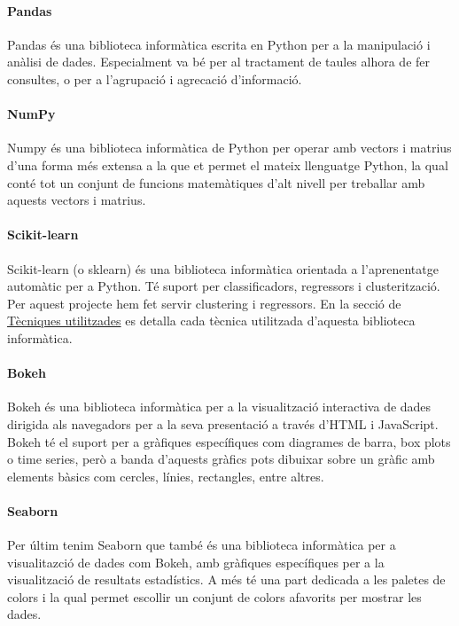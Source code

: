 \documentclass[12pt,a4paper,catalan]{article}
\begin{document}
\hypertarget{pandas}{
	\paragraph{Pandas}
}
Pandas \cite{pandas} és una biblioteca informàtica escrita en Python per a la manipulació i anàlisi de dades. Especialment va bé per al tractament de taules alhora de fer consultes, o per a l'agrupació i agrecació d'informació.

\hypertarget{numpy}{
	\paragraph{NumPy}
}
Numpy \cite{numpy} és una biblioteca informàtica de Python per operar amb vectors i matrius d'una forma més extensa a la que et permet el mateix llenguatge Python, la qual conté tot un conjunt de funcions matemàtiques d'alt nivell per treballar amb aquests vectors i matrius.

\hypertarget{sklearn}{
	\paragraph{Scikit-learn}
}
Scikit-learn \cite{sklearn} (o sklearn) és una biblioteca informàtica orientada a l'aprenentatge automàtic per a Python. Té suport per classificadors, regressors i clusterització. Per aquest projecte hem fet servir clustering i regressors. En la secció de \hyperlink{tecniquesutilitzades}{Tècniques utilitzades} es detalla cada tècnica utilitzada d'aquesta biblioteca informàtica.

\paragraph{Bokeh}
Bokeh \cite{bokeh} és una biblioteca informàtica per a la visualització interactiva de dades dirigida als navegadors per a la seva presentació a través d'HTML i JavaScript. Bokeh té el suport per a gràfiques específiques com diagrames de barra, box plots o time series, però a banda d'aquests gràfics pots dibuixar sobre un gràfic amb elements bàsics com cercles, línies, rectangles, entre altres.

\paragraph{Seaborn}
Per últim tenim Seaborn \cite{seaborn} que també és una biblioteca informàtica per a visualitazció de dades com Bokeh, amb gràfiques específiques per a la visualització de resultats estadístics. A més té una part dedicada a les paletes de colors i la qual permet escollir un conjunt de colors afavorits per mostrar les dades.
\end{document}
